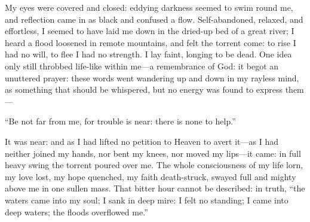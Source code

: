 My eyes were covered and closed: eddying darkness seemed to swim round
me, and reflection came in as black and confused a flow.
Self-abandoned, relaxed, and effortless, I seemed to have laid me down
in the dried-up bed of a great river; I heard a flood loosened in remote
mountains, and felt the torrent come: to rise I had no will, to flee I
had no strength. I lay faint, longing to be dead. One idea only still
throbbed life-like within me---a remembrance of God: it begot an
unuttered prayer: these words went wandering up and down in my rayless
mind, as something that should be whispered, but no energy was found to
express them---

\enquote{Be not far from me, for trouble is near: there is none to
	help.}

It was near: and as I had lifted no petition to Heaven to avert it---as
I had neither joined my hands, nor bent my knees, nor moved my lips---it
came: in full heavy swing the torrent poured over me. The whole
consciousness of my life lorn, my love lost, my hope quenched, my faith
death-struck, swayed full and mighty above me in one sullen mass. That
bitter hour cannot be described: in truth, \enquote{the waters came into
	my soul; I sank in deep mire: I felt no standing; I came into deep
	waters; the floods overflowed me.}
